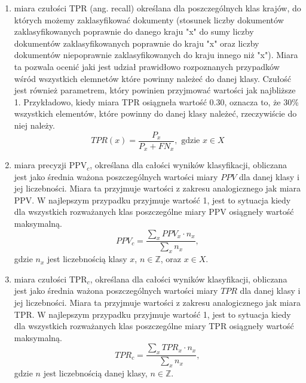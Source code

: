 \documentclass{classrep}
\begin{document}
\begin{enumerate}
\item miara czułości TPR (ang. recall) określana dla poszczególnych klas krajów, do których możemy zaklasyfikować dokumenty (stosunek liczby dokumentów zaklasyfikowanych poprawnie do danego kraju "x" do sumy liczby dokumentów zaklasyfikowanych poprawnie do kraju "x" oraz liczby dokumentów niepoprawnie zaklasyfikowanych do kraju innego niż "x").
Miara ta pozwala ocenić jaki jest udział prawidłowo rozpoznanych przypadków wśród wszystkich elemnetów które powinny należeć do danej klasy. Czułość jest również parametrem, który powinien przyjmować wartości jak najbliższe 1.
Przykładowo, kiedy miara TPR osiągneła wartość 0.30, oznacza to, że 30\% wszystkich elementów, które powinny do danej klasy należeć, rzeczywiście do niej należy.
  \begin{equation}
    TPR(x) = \frac{P_x}{ P_x + FN_x} , \text{ gdzie } x\in X 
  \end{equation}


\item miara precyzji PPV$_c$, określana dla całości wyników klasyfikacji, obliczana jest jako średnia ważona poszczególnych wartości miary \(PPV\) dla danej klasy i jej liczebności.
Miara ta przyjmuje wartości z zakresu analogicznego jak miara PPV. W najlepszym przypadku przyjmuje wartość 1, jest to sytuacja kiedy dla wszystkich rozważanych klas poszczególne miary PPV osiągneły wartość maksymalną.
  \begin{equation}
    PPV_c = \frac{\sum_{x} PPV_x \cdot n_{x}}{\sum_{x} n_{x}},
  \end{equation}
    gdzie $n_x$ jest liczebnością klasy $x$, $n\in \mathbb{Z} $, oraz $x\in X$.\\

\item miara czułości TPR$_c$, określana dla całości wyników klasyfikacji, obliczana jest jako średnia ważona poszczególnych wartości miary \(TPR\) dla danej klasy i jej liczebności.
Miara ta przyjmuje wartości z zakresu analogicznego jak miara TPR. W najlepszym przypadku przyjmuje wartość 1, jest to sytuacja kiedy dla wszystkich rozważanych klas poszczególne miary TPR osiągneły wartość maksymalną.
  \begin{equation}
    TPR_c = \frac{\sum_{x} TPR_x \cdot n_{x}}{\sum_{x} n_{x}}, 
  \end{equation}
gdzie $n$ jest liczebnością danej klasy, $n\in \mathbb{Z}$.\\


\end{enumerate}
\end{document}
